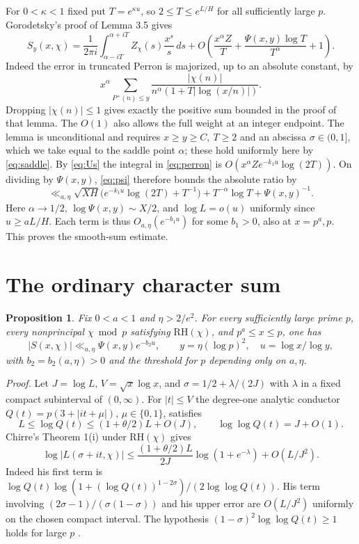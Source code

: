 \documentclass[11pt]{article}
\newtheorem{proposition}{Proposition}
\begin{document}
For \(0<\kappa<1\) fixed put \(T=e^{\kappa u}\), so
\(2\le T\le e^{L/H}\) for all sufficiently large \(p\).
Gorodetsky's proof of Lemma 3.5 \cite[(3.10)--(3.16)]{gor} gives
\begin{equation}\label{eq:perron}
 S_y(x,\chi)=\frac1{2\pi i}\int_{\alpha-iT}^{\alpha+iT}
 Z_\chi(s)\frac{x^s}{s}\,ds+
 O\!\left(\frac{x^\alpha Z}{T}
       +\frac{\Psi(x,y)\log T}{T^\alpha}+1\right).
\end{equation}
Indeed the error in truncated Perron is majorized, up to an absolute
constant, by
\[
 x^\alpha\sum_{P^+(n)\le y}
 \frac{|\chi(n)|}{n^\alpha(1+T|\log(x/n)|)}.
\]
Dropping \(|\chi(n)|\le1\) gives exactly the positive sum bounded in
the proof of that lemma. The \(O(1)\) also allows the full weight at
an integer endpoint. The lemma is unconditional and requires
\(x\ge y\ge C,\ T\ge2\) and an abscissa \(\sigma\in(0,1]\), which we take
equal to the saddle point \(\alpha\); these hold uniformly here by
\eqref{eq:saddle}. By \eqref{eq:Us} the integral in \eqref{eq:perron}
is \(O(x^\alpha Z e^{-k_1u}\log(2T))\). On dividing by \(\Psi(x,y)\),
\eqref{eq:psi} therefore bounds the absolute ratio by
\[
 \ll_{a,\eta}\sqrt{XH}\bigl(e^{-k_1u}\log(2T)+T^{-1}\bigr)
       +T^{-\alpha}\log T+\Psi(x,y)^{-1}.
\]
Here \(\alpha\to1/2\), \(\log\Psi(x,y)\sim X/2\), and
\(\log L=o(u)\) uniformly since \(u\ge aL/H\). Each term is thus
\(O_{a,\eta}(e^{-b_1u})\) for some \(b_1>0\), also at \(x=p^a,p\).
This proves the smooth-sum estimate.

\section{The ordinary character sum}
\begin{proposition}\label{prop:ordinary}
Fix \(0<a<1\) and \(\eta>2/e^2\). For every sufficiently large prime
\(p\), every nonprincipal \(\chi\bmod p\) satisfying \(\mathrm{RH}(\chi)\),
and \(p^a\le x\le p\), one has
\[
 |S(x,\chi)|\ll_{a,\eta}\Psi(x,y)e^{-b_2u},
 \qquad y=\eta(\log p)^2,\quad u=\log x/\log y ,
\]
with \(b_2=b_2(a,\eta)>0\) and the threshold for \(p\) depending only
on \(a,\eta\).
\end{proposition}
\emph{Proof.}
Let \(J=\log L\), \(V=\sqrt{x}\log x\), and
\(\sigma=1/2+\lambda/(2J)\) with \(\lambda\) in a fixed compact
subinterval of \((0,\infty)\). For \(|t|\le V\) the degree-one analytic
conductor \(Q(t)=p(3+|it+\mu|)\), \(\mu\in\{0,1\}\), satisfies
\[
 L\le\log Q(t)\le (1+\theta/2)L+O(J),\qquad
 \log\log Q(t)=J+O(1).
\]
Chirre's Theorem 1(i) under \(\mathrm{RH}(\chi)\) gives
\begin{equation}\label{eq:chirre}
 \log|L(\sigma+it,\chi)|
 \le\frac{(1+\theta/2)L}{2J}\log(1+e^{-\lambda})+O(L/J^2).
\end{equation}
Indeed his first term is
\(\log Q(t)\log(1+(\log Q(t))^{1-2\sigma})/(2\log\log Q(t))\).
His term involving \((2\sigma-1)/(\sigma(1-\sigma))\) and his upper
error are \(O(L/J^2)\) uniformly on the chosen compact interval.
The hypothesis \((1-\sigma)^2\log\log Q(t)\ge1\) holds for large \(p\)
\cite[Theorem 1(i)]{chirre}.
\end{document}

